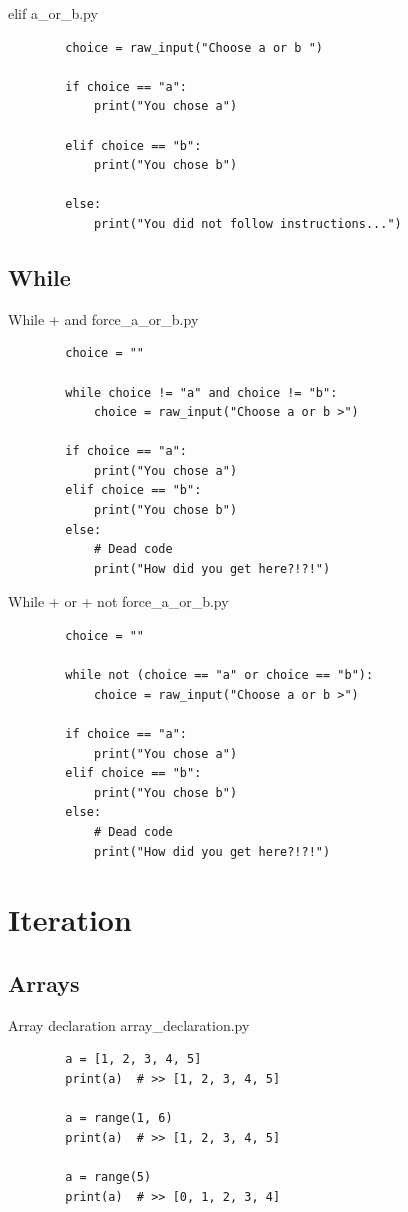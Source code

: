 \documentclass[11pt]{beamer}
\begin{document}
\begin{frame}[fragile]{elif}
	a\_or\_b.py
	\begin{lstlisting}
		choice = raw_input("Choose a or b ")

		if choice == "a":
		    print("You chose a")

		elif choice == "b":
		    print("You chose b")

		else:
		    print("You did not follow instructions...")
	\end{lstlisting}
\end{frame}

\subsection{While}
\begin{frame}[fragile]{While + and}
	force\_a\_or\_b.py
	\begin{lstlisting}
		choice = ""

		while choice != "a" and choice != "b":
	        choice = raw_input("Choose a or b >")

		if choice == "a":
		    print("You chose a")
		elif choice == "b":
		    print("You chose b")
		else:
		    # Dead code
		    print("How did you get here?!?!")
	\end{lstlisting}
\end{frame}

\begin{frame}[fragile]{While + or + not}
	force\_a\_or\_b.py
	\begin{lstlisting}
		choice = ""

		while not (choice == "a" or choice == "b"):
		    choice = raw_input("Choose a or b >")

		if choice == "a":
		    print("You chose a")
		elif choice == "b":
		    print("You chose b")
		else:
		    # Dead code
		    print("How did you get here?!?!")
	\end{lstlisting}
\end{frame}

\section{Iteration}
\subsection{Arrays}
\begin{frame}[fragile]{Array declaration}
	array\_declaration.py
	\begin{lstlisting}
		a = [1, 2, 3, 4, 5]
		print(a)  # >> [1, 2, 3, 4, 5]

		a = range(1, 6)
		print(a)  # >> [1, 2, 3, 4, 5]

		a = range(5)
		print(a)  # >> [0, 1, 2, 3, 4]
	\end{lstlisting}
\end{frame}
\end{document}
